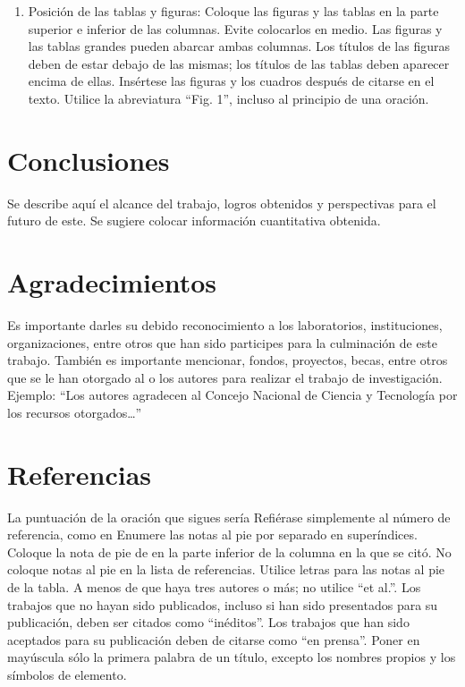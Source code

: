     \begin{enumerate}
        \item Posición de las tablas y figuras: Coloque las figuras y las tablas en la parte superior e inferior de las columnas. Evite colocarlos en medio. Las figuras y las tablas grandes pueden abarcar ambas columnas. Los títulos de las figuras deben de estar debajo de las mismas; los títulos de las tablas deben aparecer encima de ellas. Insértese las figuras y los cuadros después de citarse en el texto. Utilice la abreviatura “Fig. 1”, incluso al principio de una oración. 
    \end{enumerate}
    
    \section{Conclusiones}
    
    Se describe aquí el alcance del trabajo, logros obtenidos y perspectivas para el futuro de este. Se sugiere colocar información cuantitativa obtenida.
    
    \section{Agradecimientos}
    
    Es importante darles su debido reconocimiento a los laboratorios, instituciones, organizaciones, entre otros que han sido participes para la culminación de este trabajo. También es importante mencionar, fondos, proyectos, becas, entre otros que se le han otorgado al o los autores para realizar el trabajo de investigación. Ejemplo: “Los autores agradecen al Concejo Nacional de Ciencia y Tecnología por los recursos otorgados…”
    
    \section*{Referencias}
    
    
    
    La puntuación de la oración que sigues sería %
    Refiérase simplemente al número de referencia, como en %
    Enumere las notas al pie por separado en superíndices. Coloque la nota de pie de en la parte inferior de la columna en la que se citó. No coloque notas al pie en la lista de referencias. Utilice letras para las notas al pie de la tabla.
    A menos de que haya tres autores o más; no utilice “et al.”. Los trabajos que no hayan sido publicados, incluso si han sido presentados para su publicación, deben ser citados como “inéditos”. Los trabajos que han sido aceptados para su publicación deben de citarse como “en prensa”. Poner en mayúscula sólo la primera palabra de un título, excepto los nombres propios y los símbolos de elemento. 
    
